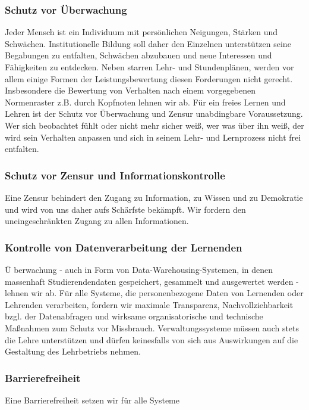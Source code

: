 \subsubsection{Schutz vor Überwachung}
\abstimmung
Jeder Mensch ist ein Individuum mit persönlichen Neigungen, Stärken und Schwächen. Institutionelle Bildung soll daher den Einzelnen unterstützen seine Begabungen zu entfalten, Schwächen abzubauen und neue Interessen und Fähigkeiten zu entdecken. Neben starren Lehr- und Stundenplänen, werden vor allem einige Formen der Leistungsbewertung diesen Forderungen nicht gerecht. Insbesondere die Bewertung von Verhalten nach einem vorgegebenen Normenraster z.B. durch Kopfnoten lehnen wir ab. Für ein freies Lernen und Lehren ist der Schutz vor Überwachung und Zensur unabdingbare Voraussetzung. Wer sich beobachtet fühlt oder nicht mehr sicher weiß, wer was über ihn weiß, der wird sein Verhalten anpassen und sich in seinem Lehr- und Lernprozess nicht frei entfalten.

\subsubsection{Schutz vor Zensur und Informationskontrolle}
\abstimmung
Eine Zensur behindert den Zugang zu Information, zu Wissen und zu Demokratie und wird von uns daher aufs Schärfste bekämpft. Wir fordern den uneingeschränkten Zugang zu allen Informationen.

\subsubsection{Kontrolle von Datenverarbeitung der Lernenden}
Ü\abstimmung
berwachung - auch in Form von Data-Warehousing-Systemen, in denen massenhaft Studierendendaten gespeichert, gesammelt und ausgewertet werden - lehnen wir ab. Für alle Systeme, die personenbezogene Daten von Lernenden oder Lehrenden verarbeiten, fordern wir maximale Transparenz, Nachvollziehbarkeit bzgl. der Datenabfragen und wirksame organisatorische und technische Maßnahmen zum Schutz vor Missbrauch. Verwaltungssysteme müssen auch stets die Lehre unterstützen und dürfen keinesfalls von sich aus Auswirkungen auf die Gestaltung des Lehrbetriebs nehmen.

\subsubsection{Barrierefreiheit}
\abstimmung
Eine Barrierefreiheit setzen wir für alle Systeme
 
